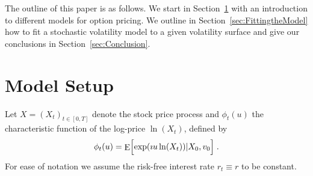 \documentclass[10pt,a4paper]{article}
\numberwithin{equation}{section} %
\theoremstyle{plain}
\theoremstyle{definition}
\theoremstyle{remark}
\providecommand{\secref}[1]{Section~\ref{#1}}
\def\tT{\ensuremath{{t\in\left[0,T\right]}}}
\DeclareMathOperator{\diag}{diag}
\DeclareMathOperator{\Diag}{Diag}
\DeclareMathOperator{\Ex}{E}
\DeclareMathOperator{\Id}{Id}
\begin{document}
The outline of this paper is as follows. We start in \secref{sec:Models} with an introduction to different models for option pricing. We outline in \secref{sec:FittingtheModel} how to fit a stochastic volatility model to a given volatility surface and give our conclusions in \secref{sec:Conclusion}.




\section{Model Setup}
\label{sec:Models}

Let $X=(X_t)_{\tT}$ denote the stock price process and $\phi_t(u)$ the characteristic function of the log-price $\ln(X_t)$, defined by
\begin{equation*}
\phi_t(u)=\Ex\Bigl[\exp (\imath u\ln (X_t))|X_0,v_0\Bigr]\;.
\end{equation*}
For ease of notation we assume the risk-free interest rate $r_t\equiv r$ to be constant.
\end{document}
